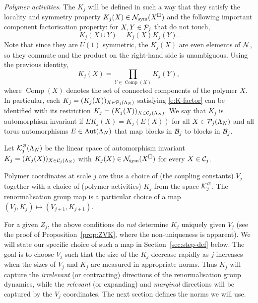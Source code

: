 \documentclass[11pt]{amsart}
\numberwithin{equation}{section}
\numberwithin{theorem}{section}
\newcommand{\1}{{\bf 1}}
\newcommand{\Comp}{\operatorname{Comp}}
\newcommand{\cKbulk}{\cK^\varnothing}
\begin{document}
\smallskip\noindent\emph{Polymer activities.}
The $K_j$ will be defined in such a way that they satisfy the locality and symmetry property
$K_j(X) \in \mathcal N_{\rm sym}(X^\square)$ and the following important
component factorisation property: for $X,Y\in \mathcal P_{j}$ that do not
touch,
\begin{equation} \label{e:K-factor}
  K_j(X \cup Y) = K_j(X)K_j(Y).
\end{equation}
Note that since they are $U(1)$ symmetric, the $K_j(X)$ are even elements of $\mathcal N$, so they commute and the
product on the right-hand side is unambiguous.
Using the previous identity,
\begin{equation}
  \label{e:K-prod}
  K_j(X) = \prod_{Y \in \Comp(X)} K_j(Y),
\end{equation}
where $\Comp(X)$ denotes the set of connected components of the polymer $X$.
In particular, 
each $K_j= (K_{j}(X))_{X\in \mathcal P_{j}(\Lambda_{N})}$ satisfying \eqref{e:K-factor} can be identified
with its restriction $K_j= (K_{j}(X))_{X\in \mathcal C_{j}(\Lambda_{N})}$.
%
We say that $K_{j}$ is automorphism invariant if
$EK_{j}(X) = K_{j}(E(X))$ for all $X\in \mathcal P_{j}(\Lambda_{N})$ and all
torus automorphisms $E \in {\rm Aut}(\Lambda_N)$ that map blocks in
$\mathcal B_j$ to blocks in $\mathcal B_j$.

\begin{definition} \label{def:cKbulk}
Let $\cKbulk_j(\Lambda_N)$ be the linear space of
automorphism invariant $K_j = (K_j(X))_{X\in\mathcal C_j(\Lambda_N)}$
with $K_j(X) \in \mathcal N_{\rm sym}(X^\square)$ for every $X \in \mathcal C_j$. 
\end{definition}

Polymer coordinates at scale $j$ are thus a choice of (the coupling constants) $V_j$ together with a choice of (polymer activities) $K_j$
from the space $\cKbulk_{j}$.
%
%
The renormalisation group map is a particular choice of a map
$(V_j,K_j)\mapsto (V_{j+1},K_{j+1})$. 

For a given $Z_j$,
the above conditions do \emph{not} determine $K_j$ uniquely given
$V_j$ (see the proof of Proposition~\ref{prop:ZVK}, where the
non-uniqueness is apparent). We will state our specific choice
  of such a map in Section~\ref{sec:step-def} below. 
The goal is to choose $V_{j}$ such that the size of the $K_{j}$
decrease rapidly as $j$ increases when the sizes of $V_{j}$ and
$K_{j}$ are measured in appropriate norms.
Thus $K_j$ will capture the \emph{irrelevant} (or contracting) directions of the
renormalisation group dynamics, while the \emph{relevant} (or expanding) and \emph{marginal}
directions will be captured by the $V_j$ coordinates.
The next section defines the norms we will use.
\end{document}
